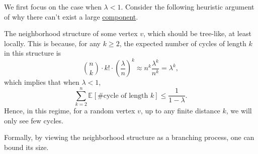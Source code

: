 We first focus on the case when \(\lambda < 1\). Consider the following heuristic argument of why there can't exist a large \hyperref[def:connected-component]{component}.
\begin{intuition}
	The neighborhood structure of some vertex \(v\), which should be tree-like, at least locally. This is because, for any \(k \geq 2\), the expected number of cycles of length \(k\) in this structure is
	\[
		\binom{n}{k} \cdot k! \cdot \left( \frac{\lambda}{n} \right) ^k
		\approx n^k \frac{\lambda ^k}{n^k}
		= \lambda ^k,
	\]
	which implies that when \(\lambda < 1\),
	\[
		\sum_{k=2}^{n} \mathbb{E}_{}[\# \text{cycle of length } k]
		\leq \frac{1}{1 - \lambda }.
	\]
	Hence, in this regime, for a random vertex \(v\), up to any finite distance \(k\), we will only see few cycles.
	\begin{center}
	\end{center}
\end{intuition}

Formally, by viewing the neighborhood structure as a branching process, one can bound its size.
